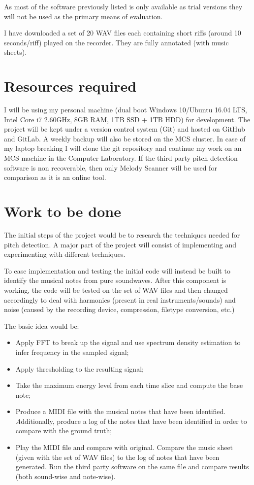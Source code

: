 \documentclass[12pt,a4paper,twoside]{article}
\begin{document}
As most of the software previously listed is only available as trial versions they will not be used as the primary means of evaluation.

I have downloaded a set of 20 WAV files each containing short riffs (around 10 seconds/riff) played on the recorder. They are fully annotated (with music sheets).

\section*{Resources required}

I will be using my personal machine (dual boot Windows 10/Ubuntu 16.04 LTS, Intel Core i7 2.60GHz, 8GB RAM, 1TB SSD + 1TB HDD) for development.
  The project will be kept under a version control system (Git) and hosted on GitHub and GitLab. A weekly backup will also be stored on the MCS cluster.
  In case of my laptop breaking I will clone the git repository and continue my work on an MCS machine in the Computer Laboratory. If the third party pitch detection software is non recoverable, then only Melody Scanner will be used for comparison as it is an online tool.

\section*{Work to be done}

The initial steps of the project would be to research the techniques needed for pitch detection.
A major part of the project will consist of implementing and experimenting with different techniques.

To ease implementation and testing the initial code will instead be built to identify the musical notes from pure soundwaves.
After this component is working, the code will be tested on the set of WAV files and then changed accordingly to deal with harmonics (present in real instruments/sounds) and noise (caused by the recording device, compression, filetype conversion, etc.)

The basic idea would be:
\begin{itemize}
  \item Apply FFT to break up the signal and use spectrum density estimation to infer frequency in the sampled signal;
  \item Apply thresholding to the resulting signal;
  \item Take the maximum energy level from each time slice and compute the base note;
  \item Produce a MIDI file with the musical notes that have been identified.
  \emph Additionally, produce a log of the notes that have been identified in order to compare with the ground truth;
  \item Play the MIDI file and compare with original. Compare the music sheet (given with the set of WAV files) to the log of notes that have been generated. Run the third party software on the same file and compare results (both sound-wise and note-wise).
\end{itemize}
\end{document}
